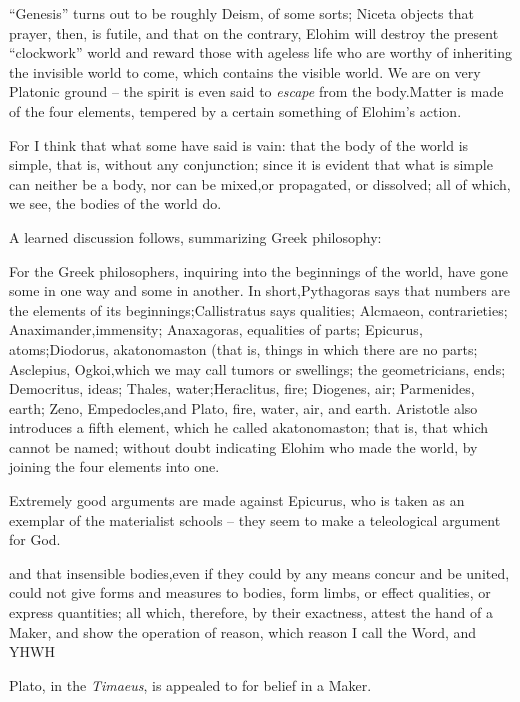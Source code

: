 ``Genesis'' turns out to be roughly Deism, of some sorts; Niceta objects that prayer, then, is futile, and that on the contrary, Elohim will destroy the present ``clockwork'' world and reward those with ageless life who are worthy of inheriting the invisible world to come, which contains the visible world. We are on very Platonic ground -- the spirit is even said to \emph{escape} from the body.Matter is made of the four elements, tempered by a certain something of Elohim's action.

For I think that what some have said is vain: that the body of the world is simple, that is, without any conjunction; since it is evident that what is simple can neither be a body, nor can be mixed,or propagated, or dissolved; all of which, we see, the bodies of the world do.

A learned discussion follows, summarizing Greek philosophy:

\begin{quotex}
For the Greek philosophers, inquiring into the beginnings of the world, have gone some in one way and some in another. In short,Pythagoras says that numbers are the elements of its beginnings;Callistratus says qualities; Alcmaeon, contrarieties; Anaximander,immensity; Anaxagoras, equalities of parts; Epicurus, atoms;Diodorus, akatonomaston (that is, things in which there are no parts; Asclepius, Ogkoi,which we may call tumors or swellings; the geometricians, ends; Democritus, ideas; Thales, water;Heraclitus, fire; Diogenes, air; Parmenides, earth; Zeno, Empedocles,and Plato, fire, water, air, and earth. Aristotle also introduces a fifth element, which he called akatonomaston; that is, that which cannot be named; without doubt indicating Elohim who made the world, by joining the four elements into one.
\end{quotex}


Extremely good arguments are made against Epicurus, who is taken as an exemplar of the materialist schools -- they seem to make a teleological argument for God.

\begin{quotex}
and that insensible bodies,even if they could by any means concur and be united, could not give forms and measures to bodies, form limbs, or effect qualities, or express quantities; all which, therefore, by their exactness, attest the hand of a Maker, and show the operation of reason, which reason I call the Word, and YHWH
\end{quotex}


Plato, in the \emph{Timaeus}, is appealed to for belief in a Maker.

